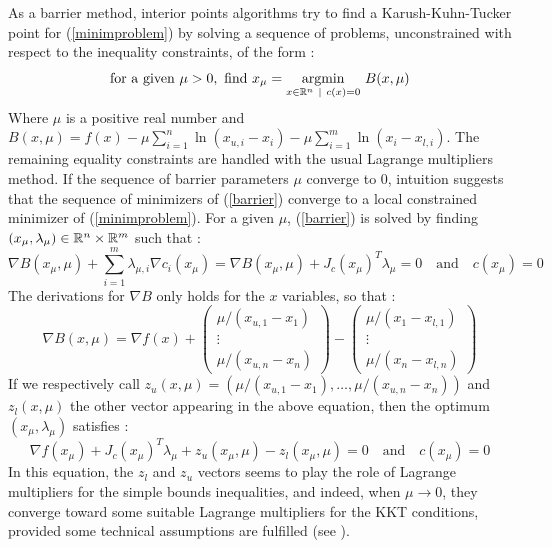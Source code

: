 \documentclass[a4paper,twoside,12pt]{book}
\begin{document}
As a barrier method, interior points algorithms try to find a Karush-Kuhn-Tucker point for (\ref{minimproblem}) by solving a sequence of problems, unconstrained with respect to the inequality constraints, of the form :
\begin{equation}\label{barrier}
\mathrm{for\ a\ given\ }\mu > 0,\ \mathrm{find}\ x_{\mu} = \underset{x\in\R^{n}\ \vert\ c(x)=0}{\operatorname{argmin}}\  B(x,\mu) 
\end{equation}
Where $\mu$ is a positive real number and $B(x,\mu) = f(x) - \displaystyle{\mu\sum_{i=1}^{n} \ln (x_{u,i}-x_{i})} - \displaystyle{\mu\sum_{i=1}^{m} \ln(x_{i}-x_{l,i})}$.
The remaining equality constraints are handled with the usual Lagrange multipliers method.
If the sequence of barrier parameters $\mu$ converge to 0, intuition suggests that the sequence of minimizers of (\ref{barrier}) converge to a local constrained minimizer of (\ref{minimproblem}). For a given $\mu$, (\ref{barrier}) is solved by finding $(x_{\mu},\lambda_{\mu})\in\mathbb{R}^{n}\times\mathbb{R}^{m}$ such that :
\begin{equation}\label{muproblem}
 \nabla B(x_{\mu},\mu) + \displaystyle{\sum_{i=1}^{m}\lambda_{\mu,i}\nabla c_{i}(x_{\mu})}
 = \nabla B(x_{\mu},\mu) + J_{c}(x_{\mu})^{T}\lambda_{\mu} = 0\quad \text{and}\quad c(x_{\mu}) = 0
\end{equation}
The derivations for $\nabla B$ only holds for the $x$ variables, so that :
\[
\nabla B(x,\mu) = \nabla f(x) + \left(\begin{matrix}\mu/(x_{u,1}-x_{1}) \\ \vdots \\ \mu/(x_{u,n}-x_{n})\end{matrix}\right) - \left(\begin{matrix}\mu/(x_{1}-x_{l,1}) \\ \vdots \\ \mu/(x_{n}-x_{l,n})\end{matrix}\right)
\]
If we respectively call $z_{u}(x,\mu) = \left(\mu/(x_{u,1}-x_{1}),\dots, \mu/(x_{u,n}-x_{n})\right)$ and $z_{l}(x,\mu)$ the other vector appearing in the above equation, then the optimum $(x_{\mu},\lambda_{\mu})$ 
satisfies :
\begin{equation}\label{muproblemlambda}
\nabla f(x_{\mu}) + J_{c}(x_{\mu})^{T}\lambda_{\mu}+ z_{u}(x_{\mu},\mu) - z_{l}(x_{\mu},\mu) = 0 \quad \text{and} \quad c(x_{\mu}) = 0
\end{equation}
In this equation, the $z_l$ and $z_u$ vectors seems to play the role of Lagrange multipliers for the simple bounds inequalities, and indeed, when $\mu\rightarrow 0$, they converge toward some suitable Lagrange multipliers for the KKT conditions, provided some technical assumptions are fulfilled (see \cite{ipintro}). 
\end{document}
